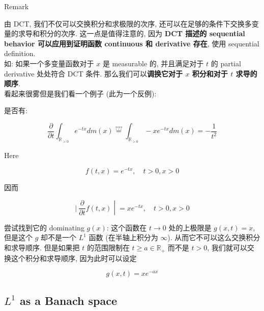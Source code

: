\documentclass{qlnotes-export}
\begin{document}
\begin{qlremark}{Remark}

由 DCT, 我们不仅可以交换积分和求极限的次序, 还可以在足够的条件下交换多变量的求导和积分的次序. 这一点是值得注意的, 因为 \textbf{DCT 描述的 sequential behavior 可以应用到证明函数 continuous 和 derivative 存在}, 使用 sequential definition.\\
如: 如果一个多变量函数对于 \(x\) 是 measurable 的, 并且满足对于 \(t\) 的 partial derivative 处处符合 DCT 条件. 那么我们可以\textbf{调换它对于 \(x\) 积分和对于 \(t\) 求导的顺序}.\\
看起来很雾但是我们看一个例子 (此为一个反例):

\end{qlremark}

\begin{example}\label{ex-05-integration-of-real-and-complex-functions-example-003}

是否有:

\[\frac{\partial}{\partial t}\int_{{\mathbb{R}}_{> 0}}e^{- tx} dm(x)\overset{???}{=}\int_{{\mathbb{R}}_{> 0}} - xe^{- tx} dm(x) = - \frac{1}{t^{2}}\]

Here

\[f(t,x) = e^{- tx},\quad t > 0,x > 0\]

因而

\[\left. |\ \frac{\partial}{\partial t}f(t,x) \middle| = xe^{- tx},\quad t > 0,x > 0 \right.\]

尝试找到它的 dominating \(g(x)\): 这个函数在 \(t\rightarrow 0\) 处的上极限是 \(g(x,t) = x\), 但是这个 \(g\) 却不是一个 \(L^{1}\) 函数 (在半轴上积分为 \(\infty\)). 从而它不可以这么交换积分和求导顺序. 但是如果把 \(t\) 的范围限制在 \(t \geq a \in {\mathbb{R}}_{+}\) 而不是 \(t > 0\), 我们就可以交换这个积分和求导顺序, 因为此时可以设定

\[g(x,t) = xe^{- ax}\]

\end{example}

\subsection{\texorpdfstring{\(L^{1}\) as a Banach space}{L\^{}\{1\} as a Banach space}}\label{l1-as-a-banach-space}
\end{document}
